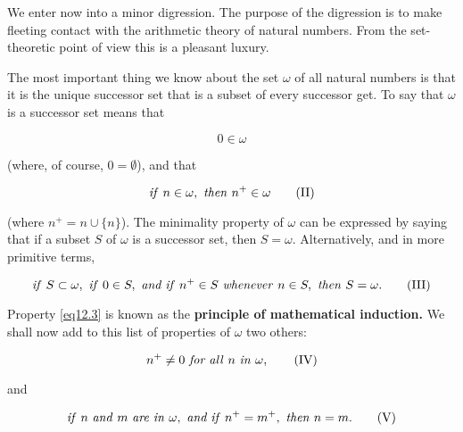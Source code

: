 We enter now into a minor digression. The purpose of the digression is to make fleeting contact with the arithmetic theory of natural numbers. From the set-theoretic point of view this is a pleasant luxury. 

The most important thing we know about the set $\omega$ of all natural numbers is that it is the unique successor set that is a subset of every successor get. To say that $\omega$ is a successor set means that

\begin{equation}
\label{eq12.1}
0 \in \omega \tag{I}
\end{equation}

(where, of course, $0 = \emptyset$), and that 

\begin{equation}
\label{eq12.2}
\text{\textit{if} } n \in\omega, \text{ \textit{then} } n^{+} \in \omega \tag{II}
\end{equation}

(where $n^{+} = n \cup \{ n \}$). The minimality property of $\omega$ can be expressed by saying that if a subset $S$ of $\omega$ is a successor set, then $S = \omega$. Alternatively, and in more primitive terms,

\begin{equation}
\label{eq12.3}
\text{\textit{if} } S \subset \omega, \text{ \textit{if} } 0 \in S, \text{ \textit{and if} } n^{+} \in S \text{ \textit{whenever} } n \in S, \text{ \textit{then} } S = \omega . \tag{III}
\end{equation}

Property \eqref{eq12.3} is known as the \textbf{principle of mathematical induction.} We shall now add to this list of properties of $\omega$ two others: 

\begin{equation}
\label{eq12.4}
n^{+} \neq 0 \text{ \textit{for all} } n \text{ \textit{in} } \omega , \tag{IV}
\end{equation}

and

\begin{equation}
\label{eq12.5}
\text{\textit{if} } n \text{ \textit{and} } m \text{ \textit{are in} } \omega , \text{ \textit{and if} } n^{+} = m^{+} , \text{ \textit{then} } n = m.\tag{V}
\end{equation}

